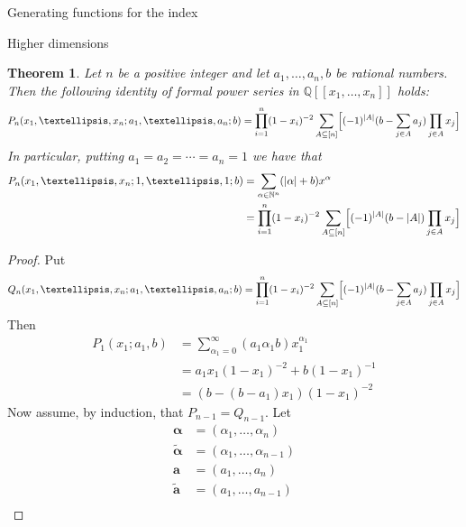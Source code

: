 \documentclass[reqno,a4paper,10pt]{amsart}
\theoremstyle{definition}
\theoremstyle{remark}
\theoremstyle{plain}
\newtheorem{theorem}[definition]{Theorem}
\newcommand{\vek}[1]{\boldsymbol{#1}}
\newcommand{\tdeg}[1]{\lvert #1 \rvert}
\newcommand{\Nat}{{\mathbb{N}}}
\newcommand{\Q}{{\mathbb{Q}}}
\begin{document}
\begin{section}{Generating functions for the index}
\begin{subsection}{Higher dimensions}
  \begin{theorem}\label{thm:Pn}
    Let \(n\) be a positive integer and let \(a_1,\dots,a_n,b\) be
    rational numbers. Then
    the following identity of 
    formal power series in \(\Q[[x_1,\dots,x_n]]\) holds:
    \begin{equation}
      \label{eq:2}
      P_n(x_1,\dots,x_n;a_1,\dots,a_n;b) = 
      \prod_{i=1}^n(1-x_i)^{-2} \sum_{A \subseteq [n]} \Bigl[
      (-1)^{\tdeg{A}}(b-\sum_{j \in A} a_j) \prod_{j \in A} x_j \Bigr]
    \end{equation}
    In particular, putting \(a_1=a_2 = \cdots = a_n = 1\) we have that
    \begin{equation}
      \label{eq:1}
      \begin{split}
      P_n(x_1,\dots,x_n;1,\dots,1;b) &=
      \sum_{\alpha \in \Nat^n} (\tdeg{\alpha} + b) x^\alpha \\
      &=
      \prod_{i=1}^n(1-x_i)^{-2} \sum_{A \subseteq [n]} \Bigl[
      (-1)^{\tdeg{A}}(b-\tdeg{A}) \prod_{j \in A} x_j \Bigr]
      \end{split}
    \end{equation}
  \end{theorem}
  \begin{proof}
    Put
    \begin{displaymath}
      Q_n(x_1,\dots,x_n;a_1,\dots,a_n;b) =
      \prod_{i=1}^n(1-x_i)^{-2} \sum_{A \subseteq [n]} \Bigl[  
      (-1)^{\tdeg{A}}(b-\sum_{j \in A} a_j) \prod_{j \in A} x_j \Bigr] 
    \end{displaymath}
    Then
    \begin{displaymath}
      \begin{split}
        P_1(x_1;a_1,b) &= \sum_{\alpha_1=0}^\infty
        (a_1\alpha_1 b) x_1^{\alpha_1} \\
        &= a_1 x_1(1-x_1)^{-2} + b(1-x_1)^{-1} \\
        &= (b-(b-a_1)x_1)(1-x_1)^{-2}
      \end{split}
    \end{displaymath}
    Now assume, by induction, that \(P_{n-1}=Q_{n-1}\). 
    Let 
    \begin{displaymath}
      \begin{split}
        \vek{\alpha} & =(\alpha_1,\dots,\alpha_n) \\
        \widetilde{\vek{\alpha}} &= (\alpha_1,\dots,\alpha_{n-1}) \\
        \vek{a} & = (a_1,\dots,a_n) \\
        \widetilde{\vek{a}} &= (a_1,\dots,a_{n-1})\\

\end{split}
\end{displaymath}
\end{proof}
\end{subsection}
\end{section}
\end{document}
